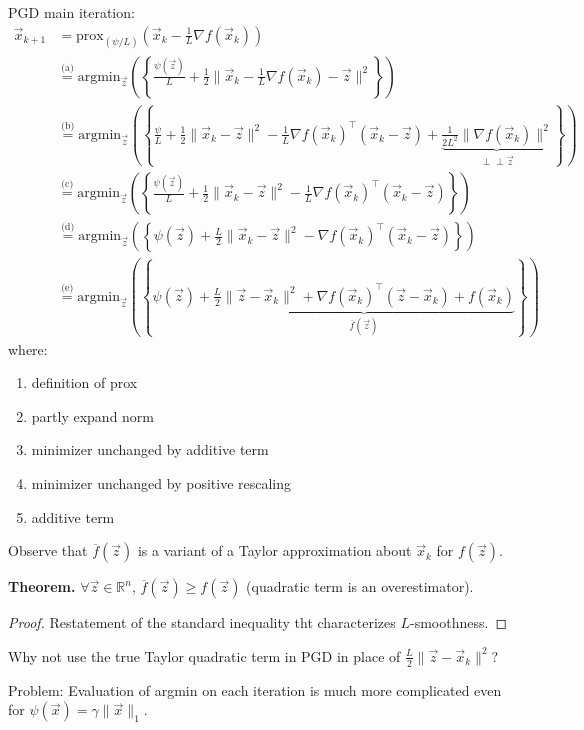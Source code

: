 \documentclass{article}
\newcommand{\R}{\mathbb{R}}             %
\newcommand{\x}{\vec{x}}                %
\newcommand{\z}{\vec{z}}                %
\newcommand{\indep}{\perp\!\!\!\perp}
\newcommand{\rl}[1]{\left(#1\right)}
\begin{document}
PGD main iteration:
\begin{align*}
    \x_{k + 1} &= \text{prox}_(\psi/L)(\x_k - \frac{1}{L} \nabla f(\x_k)) \\
    &\overset{\text{(a)}}{=} \text{argmin}_{\z}\rl{\left\{\frac{\psi(\z)}{L} + \frac{1}{2}\|\x_k - \frac{1}{L} \nabla f(\x_k) - \z\|^2\right\}} \\
    &\overset{\text{(b)}}{=} \text{argmin}_{\z} \rl{\left\{\frac{\psi}{L} + \frac{1}{2} \|\x_k - \z\|^2 - \frac{1}{L}\nabla f(\x_k)^\top(\x_k - \z) + \underbrace{\frac{1}{2L^2}\|\nabla f(\x_k)\|^2}_{\indep \z}\right\}} \\
    &\overset{\text{(c)}}{=} \text{argmin}_{\z} \rl{\left\{\frac{\psi(\z)}{L} + \frac{1}{2}\|\x_k - \z\|^2 - \frac{1}{L}\nabla f(\x_k)^\top(\x_k - \z)\right\}} \\
    &\overset{\text{(d)}}{=} \text{argmin}_{\z} \rl{\left\{\psi(\z) + \frac{L}{2}\|\x_k - \z\|^2 - \nabla f(\x_k)^\top(\x_k - \z)\right\}} \\
    &\overset{\text{(e)}}{=} \text{argmin}_{\z} \rl{\left\{\psi(\z) + \underbrace{\frac{L}{2}\|\z - \x_k\|^2 + \nabla f(\x_k)^\top(\z - \x_k) + f(\x_k)}_{\overline{f}(\z)}\right\}}
\end{align*}
where:
\begin{enumerate}[label=(\alph*)]
    \item definition of prox
    \item partly expand norm
    \item minimizer unchanged by additive term
    \item minimizer unchanged by positive rescaling
    \item additive term
\end{enumerate}
Observe that $\overline{f}(\z)$ is a variant of a Taylor approximation about $\x_k$ for $f(\z)$.


\textbf{Theorem.} $\forall \z \in \R^n$, $\overline{f}(\z) \geq f(\z)$ (quadratic term is an overestimator).

\begin{proof}
    Restatement of the standard inequality tht characterizes $L$-smoothness.
\end{proof}

Why not use the true Taylor quadratic term in PGD in place of $\frac{L}{2}\|\z - \x_k\|^2$?

Problem: Evaluation of argmin on each iteration is much more complicated even for $\psi(\x) = \gamma \|\x\|_1$.
\end{document}
